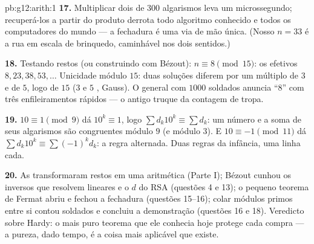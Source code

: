 \begin{solution}{pb:g12:arith:1}
\textbf{17.} Multiplicar dois  de $300$ algarismos leva um
microssegundo; recuperá-los a partir do produto derrota todo
algoritmo conhecido e todos os computadores do mundo --- a
fechadura é uma via de mão única. (Nosso $n = 33$ é a rua em
escala de brinquedo, caminhável nos dois sentidos.)

\textbf{18.} Testando restos (ou construindo com Bézout):
$n \equiv 8 \pmod{15}$: os efetivos $8, 23, 38, 53, \dots$
Unicidade módulo $15$: duas soluções diferem por um múltiplo de
$3$ e de $5$, logo de $15$ ($3$ e $5$ , Gauss).
O general com $1000$ soldados anuncia ``$8$'' com três
enfileiramentos rápidos --- o antigo truque da contagem de
tropa.

\textbf{19.} $10 \equiv 1 \pmod 9$ dá $10^k \equiv 1$, logo
$\sum d_k 10^k \equiv \sum d_k$: um número e a soma de seus
algarismos são congruentes módulo $9$ (e módulo $3$). E
$10 \equiv -1 \pmod{11}$ dá
$\sum d_k 10^k \equiv \sum (-1)^k d_k$: a regra alternada. Duas
regras da infância, uma linha cada.

\textbf{20.} As  transformaram restos em uma
aritmética (Parte I); Bézout cunhou os inversos que resolvem
 lineares e o $d$ do RSA (questões 4 e 13); o
pequeno teorema de Fermat abriu e fechou a fechadura (questões
15--16); colar módulos primos entre si contou soldados e
concluiu a demonstração (questões 16 e 18). Veredicto sobre
Hardy: o mais puro teorema que ele conhecia hoje protege cada
compra --- a pureza, dado tempo, é a coisa mais aplicável que
existe.
\end{solution}
